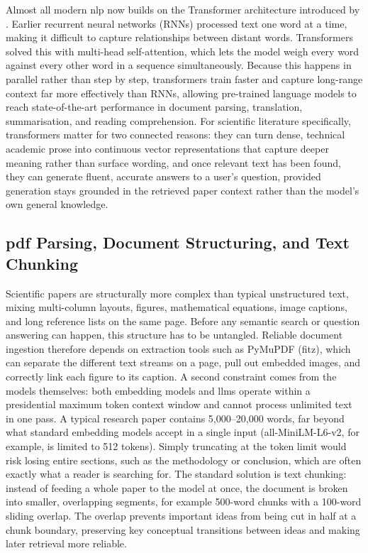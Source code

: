 Almost all modern \gls{nlp} now builds on the Transformer architecture introduced by \citet{vaswani2017attention}. Earlier recurrent neural networks (RNNs) processed text one word at a time, making it difficult to capture relationships between distant words. Transformers solved this with multi-head self-attention, which lets the model weigh every word against every other word in a sequence simultaneously. Because this happens in parallel rather than step by step, transformers train faster and capture long-range context far more effectively than RNNs, allowing pre-trained language models to reach state-of-the-art performance in document parsing, translation, summarisation, and reading comprehension.
\newline \newline For scientific literature specifically, transformers matter for two connected reasons: they can turn dense, technical academic prose into continuous vector representations that capture deeper meaning rather than surface wording, and once relevant text has been found, they can generate fluent, accurate answers to a user's question, provided generation stays grounded in the retrieved paper context rather than the model's own general knowledge.

\subsection{\gls{pdf} Parsing, Document Structuring, and Text Chunking}

Scientific papers are structurally more complex than typical unstructured text, mixing multi-column layouts, figures, mathematical equations, image captions, and long reference lists on the same page. Before any semantic search or question answering can happen, this structure has to be untangled. Reliable document ingestion therefore depends on extraction tools such as PyMuPDF (fitz), which can separate the different text streams on a page, pull out embedded images, and correctly link each figure to its caption.
\newline \newline A second constraint comes from the models themselves: both embedding models and \gls{llm}s operate within a presidential maximum token context window and cannot process unlimited text in one pass. A typical research paper contains 5,000–20,000 words, far beyond what standard embedding models accept in a single input (all-MiniLM-L6-v2, for example, is limited to 512 tokens). Simply truncating at the token limit would risk losing entire sections, such as the methodology or conclusion, which are often exactly what a reader is searching for.
\newline \newline The standard solution is text chunking: instead of feeding a whole paper to the model at once, the document is broken into smaller, overlapping segments, for example 500-word chunks with a 100-word sliding overlap. The overlap prevents important ideas from being cut in half at a chunk boundary, preserving key conceptual transitions between ideas and making later retrieval more reliable.

